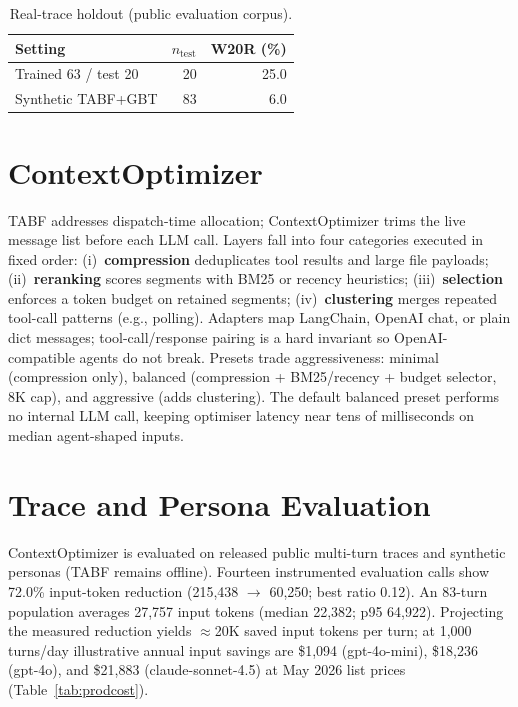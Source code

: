 \documentclass[journal]{IEEEtran}
\newcommand{\code}[1]{{\small #1}}
\begin{document}
\begin{table}[!t]
\caption{Real-trace holdout (public evaluation corpus).}
\label{tab:real}
\centering
\footnotesize
\begin{tabular}{lrr}
\toprule
Setting & $n_\text{test}$ & W20R (\%) \\
\midrule
Trained 63 / test 20 & 20 & 25.0 \\
Synthetic TABF+GBT & 83 & 6.0 \\
\bottomrule
\end{tabular}
\end{table}

\section{ContextOptimizer}
\label{sec:optimizer}

TABF addresses dispatch-time allocation; ContextOptimizer trims the live
message list before each LLM call. Layers fall into four categories executed in
fixed order: (i)~\textbf{compression} deduplicates tool results and large file
payloads; (ii)~\textbf{reranking} scores segments with BM25 or recency heuristics;
(iii)~\textbf{selection} enforces a token budget on retained segments;
(iv)~\textbf{clustering} merges repeated tool-call patterns (e.g., polling).
Adapters map LangChain, OpenAI chat, or plain dict messages; tool-call/response
pairing is a hard invariant so OpenAI-compatible agents do not break. Presets
trade aggressiveness: \code{minimal} (compression only), \code{balanced}
(compression + BM25/recency + budget selector, 8K cap), and \code{aggressive}
(adds clustering). The default \code{balanced} preset performs no internal LLM
call, keeping optimiser latency near tens of milliseconds on median agent-shaped
inputs.

\section{Trace and Persona Evaluation}
\label{sec:production}

ContextOptimizer is evaluated on released public multi-turn traces and synthetic
personas (TABF remains offline). Fourteen instrumented evaluation calls show 72.0\% input-token reduction
(215{,}438 $\to$ 60{,}250; best ratio 0.12). An 83-turn population averages
27{,}757 input tokens (median 22{,}382; p95 64{,}922). Projecting the measured
reduction yields ${\approx}$20K saved input tokens per turn; at 1{,}000 turns/day
illustrative annual input savings are \$1{,}094 (gpt-4o-mini), \$18{,}236
(gpt-4o), and \$21{,}883 (claude-sonnet-4.5) at May 2026 list prices
(Table~\ref{tab:prodcost}).
\end{document}
